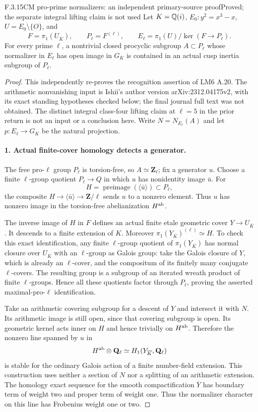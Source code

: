\begin{result}{F.3.15}{CM pro-prime normalizers: an independent primary-source proof}{Proved; the separate integral lifting claim is not used}
Let $K=\mathbb Q(i)$, $E_0:y^2=x^3-x$, $U=E_0\setminus\{O\}$, and
\[
 F=\pi_1(U_{\overline K}),\qquad P_\ell=F^{(\ell)},\qquad
 E_\ell=\pi_1(U)/\ker(F\to P_\ell).
\]
For every prime $\ell$, a nontrivial closed procyclic subgroup $A\subset P_\ell$ whose normalizer in $E_\ell$ has open image in $G_K$ is contained in an actual cusp inertia subgroup of $P_\ell$.
\end{result}
\begin{proof}
This independently re-proves the recognition assertion of LM6 A.20. The arithmetic nonvanishing input is Ishii's author version arXiv:2312.04175v2, with its exact standing hypotheses checked below; the final journal full text was not obtained. The distinct integral class-four lifting claim at $\ell=5$ in the prior return is not an input or a conclusion here.
Write $N=N_{E_\ell}(A)$ and let $p:E_\ell\to G_K$ be the natural projection.

\paragraph{1. Actual finite-cover homology detects a generator.}
The free pro-$\ell$ group $P_\ell$ is torsion-free, so $A\simeq\mathbf Z_\ell$; fix a generator $u$. Choose a finite $\ell$-group quotient $P_\ell\to Q$ in which $u$ has nonidentity image $\bar u$. For
\[
 H=\operatorname{preimage}(\langle\bar u\rangle)\subset P_\ell,
\]
the composite $H\to\langle\bar u\rangle\to\mathbf Z/\ell$ sends $u$ to a nonzero element. Thus $u$ has nonzero image in the torsion-free abelianization $H^{\rm ab}$.

The inverse image of $H$ in $F$ defines an actual finite etale geometric cover $Y\to U_{\overline K}$. It descends to a finite extension of $K$. Moreover $\pi_1(Y_{\overline K})^{(\ell)}\simeq H$. To check this exact identification, any finite $\ell$-group quotient of $\pi_1(Y_{\overline K})$ has normal closure over $U_{\overline K}$ with an $\ell$-group as Galois group: take the Galois closure of $Y$, which is already an $\ell$-cover, and the compositum of its finitely many conjugate $\ell$-covers. The resulting group is a subgroup of an iterated wreath product of finite $\ell$-groups. Hence all these quotients factor through $P_\ell$, proving the asserted maximal-pro-$\ell$ identification.

Take an arithmetic covering subgroup for a descent of $Y$ and intersect it with $N$. Its arithmetic image is still open, since that covering subgroup is open. Its geometric kernel acts inner on $H$ and hence trivially on $H^{\rm ab}$. Therefore the nonzero line spanned by $u$ in
\[
 H^{\rm ab}\otimes\mathbf Q_\ell
 \simeq H_1(Y_{\overline K},\mathbf Q_\ell)
\]
is stable for the ordinary Galois action of a finite number-field extension. This construction uses neither a section of $N$ nor a splitting of an arithmetic extension. The homology exact sequence for the smooth compactification $\overline Y$ has boundary term of weight two and proper term of weight one. Thus the normalizer character on this line has Frobenius weight one or two.


\end{proof}
